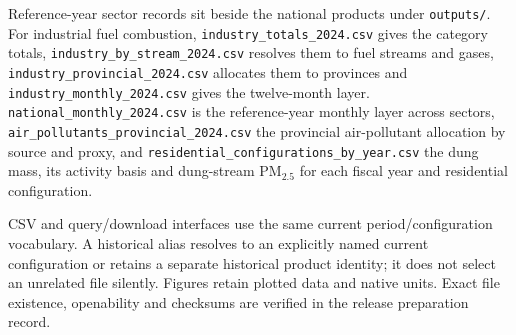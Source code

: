 Reference-year sector records sit beside the national products under \texttt{outputs/}. For industrial fuel combustion, \texttt{industry\_\allowbreak totals\_\allowbreak 2024.csv} gives the category totals, \texttt{industry\_\allowbreak by\_\allowbreak stream\_\allowbreak 2024.csv} resolves them to fuel streams and gases, \texttt{industry\_\allowbreak provincial\_\allowbreak 2024.csv} allocates them to provinces and \texttt{industry\_\allowbreak monthly\_\allowbreak 2024.csv} gives the twelve-month layer. \texttt{national\_\allowbreak monthly\_\allowbreak 2024.csv} is the reference-year monthly layer across sectors, \texttt{air\_\allowbreak pollutants\_\allowbreak provincial\_\allowbreak 2024.csv} the provincial air-pollutant allocation by source and proxy, and \texttt{residential\_\allowbreak configurations\_\allowbreak by\_\allowbreak year.csv} the dung mass, its activity basis and dung-stream PM$_{2.5}$ for each fiscal year and residential configuration.

CSV and query/download interfaces use the same current period/configuration vocabulary. A historical alias resolves to an explicitly named current configuration or retains a separate historical product identity; it does not select an unrelated file silently. Figures retain plotted data and native units. Exact file existence, openability and checksums are verified in the release preparation record.
